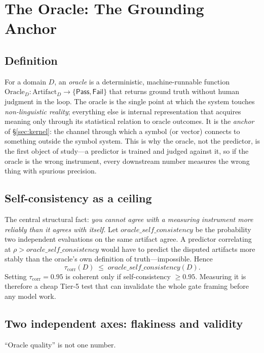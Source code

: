 \documentclass[10pt,twocolumn]{article}
\begin{document}
\section{The Oracle: The Grounding Anchor}
\label{sec:oracle}

\subsection{Definition}
For a domain $D$, an \emph{oracle} is a deterministic, machine-runnable function
$\mathrm{Oracle}_D:\mathrm{Artifact}_D\to\{\textsf{Pass},\textsf{Fail}\}$ that
returns ground truth without human judgment in the loop. The oracle is the single
point at which the system touches \emph{non-linguistic reality}; everything else
is internal representation that acquires meaning only through its statistical
relation to oracle outcomes. It is the \emph{anchor} of \S\ref{sec:kernel}: the
channel through which a symbol (or vector) connects to something outside the
symbol system. This is why the oracle, not the predictor, is the first object of
study---a predictor is trained and judged against it, so if the oracle is the
wrong instrument, every downstream number measures the wrong thing with spurious
precision.

\subsection{Self-consistency as a ceiling}
The central structural fact: \emph{you cannot agree with a measuring instrument
more reliably than it agrees with itself}. Let
$\textit{oracle\_self\_consistency}$ be the probability two independent
evaluations on the same artifact agree. A predictor correlating at
$\rho>\textit{oracle\_self\_consistency}$ would have to predict the disputed
artifacts more stably than the oracle's own definition of truth---impossible.
Hence
\begin{equation}
\tau_{\mathrm{corr}}(D)\;\le\;\textit{oracle\_self\_consistency}(D).
\end{equation}
Setting $\tau_{\mathrm{corr}}=0.95$ is coherent only if self-consistency
$\ge0.95$. Measuring it is therefore a cheap Tier-5 test that can invalidate the
whole gate framing before any model work.

\subsection{Two independent axes: flakiness and validity}
``Oracle quality'' is not one number.
\end{document}
